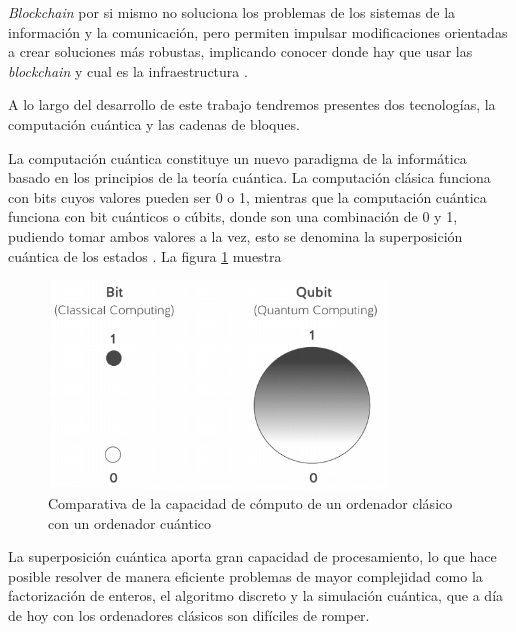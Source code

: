 \begin{itemize}
\textit{Blockchain} por si mismo no soluciona los problemas de los sistemas de la información y la comunicación, pero permiten impulsar modificaciones orientadas a crear soluciones más robustas, implicando conocer donde hay que usar las \textit{blockchain} y cual es la infraestructura \cite{blockchain}.


	
	
	A lo largo del desarrollo de este trabajo tendremos presentes dos tecnologías, la computación cuántica y las cadenas de bloques. 

La computación cuántica constituye un nuevo paradigma de la informática basado en los principios de la teoría cuántica. La computación clásica funciona con bits cuyos valores pueden ser 0 o 1, mientras que la computación cuántica funciona con bit cuánticos o cúbits, donde son una combinación de 0 y 1, pudiendo tomar ambos valores a la vez, esto se denomina la superposición cuántica de los estados \cite{computacioncuantica-criptografia}.
La figura \ref{fig:bit-cubit} muestra

\begin{figure}[h]
	\centering
	\includegraphics[width=0.8\textwidth]{figuras/bit_cubit.png}
	\caption{Comparativa de la capacidad de cómputo de un ordenador clásico con un ordenador cuántico\cite{clasica-vs-cuantica}}
	\label{fig:bit-cubit}
\end{figure}

La superposición cuántica aporta gran capacidad de procesamiento, lo que hace posible resolver de manera eficiente problemas de mayor complejidad como la factorización de enteros, el algoritmo discreto y la simulación cuántica, que a día de hoy con los ordenadores clásicos son difíciles de romper. 


\end{itemize}

